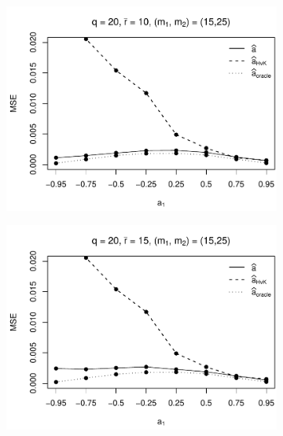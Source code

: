\begin{figure}[p]
\begin{subfigure}[b]{0.45\textwidth}
\includegraphics[width=\textwidth]{Plots/Robustness/MSE_a1_zoomed_T=500_slope=10_(q,K1,K2,M1,M2)=(20,2,10,15,25).pdf}
\end{subfigure}
\hspace{0.25cm}
\begin{subfigure}[b]{0.45\textwidth}
\includegraphics[width=\textwidth]{Plots/Robustness/MSE_a1_zoomed_T=500_slope=10_(q,K1,K2,M1,M2)=(20,2,15,15,25).pdf}
\end{subfigure}


\end{figure}
